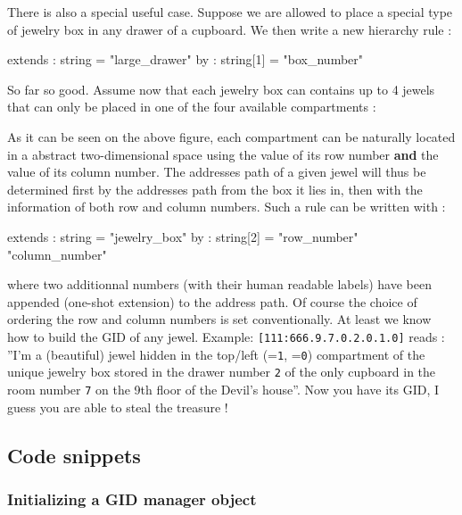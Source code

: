 There is also a special useful case. Suppose we are allowed
to place a special type of jewelry box in any drawer of a cupboard.
We then write a new hierarchy rule :
\begin{ShellVerbatim}
[category="jewelry_box" type="110"]
extends : string    = "large_drawer"
by      : string[1] = "box_number"
\end{ShellVerbatim}
So far so good. Assume now that each jewelry box can contains
up to 4 jewels that can only be placed in one of the
four available compartments :

    \begin{center}
      \scalebox{1.0}{}
    \end{center}
As it can be seen on the above figure,
each compartment can be naturally located in a abstract
two-dimensional space using the value of its row number
\textbf{and} the value of its column number.
The addresses path of a given jewel will thus be determined 
first by the addresses path from the box it lies in, then
with the information of both row and column numbers.
Such a rule can be written with : 
\begin{ShellVerbatim}
[category="jewel" type="111"]
extends : string    = "jewelry_box"
by      : string[2] = "row_number" "column_number"
\end{ShellVerbatim}
\pn where  two additionnal numbers (with their  human readable labels)
have been appended (one-shot extension) to the address path. Of course
the  choice   of  ordering   the  row  and   column  numbers   is  set
conventionally. At  least we know how  to build the GID  of any jewel.
Example: \verb+[111:666.9.7.0.2.0.1.0]+ reads : \\
 ''I'm a  (beautiful) jewel
hidden in the top/left (=\texttt{1}, =\texttt{0})
compartment  of the  unique jewelry  box stored  in the  drawer number
\texttt{2} of the  only cupboard in the room  number \texttt{7} on the
9th floor of the Devil's house''. Now you have its GID, 
I guess you are able to steal the treasure !

\pagebreak
\subsection{Code snippets}

\subsubsection{Initializing a GID manager object}

